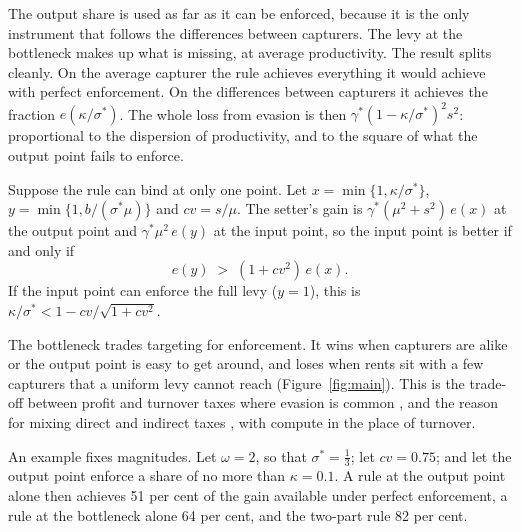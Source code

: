 The output share is used as far as it can be enforced, because it is the only instrument
that follows the differences between capturers. The levy at the bottleneck makes up what
is missing, at average productivity. The result splits cleanly. On the average capturer
the rule achieves everything it would achieve with perfect enforcement. On the
differences between capturers it achieves the fraction $e(\kappa/\sigma^*)$. The whole
loss from evasion is then $\gamma^*(1-\kappa/\sigma^*)^2s^2$: proportional to the
dispersion of productivity, and to the square of what the output point fails to enforce.

\begin{corollary}\label{cor:one}
Suppose the rule can bind at only one point. Let $x=\min\{1,\kappa/\sigma^*\}$,
$y=\min\{1,b/(\sigma^*\mu)\}$ and $cv=s/\mu$. The setter's gain is
$\gamma^*(\mu^2+s^2)\,e(x)$ at the output point and $\gamma^*\mu^2\,e(y)$ at the input
point, so the input point is better if and only if
\begin{equation}
  e(y)\;>\;(1+cv^2)\,e(x).
\end{equation}
If the input point can enforce the full levy ($y=1$), this is
$\kappa/\sigma^*<1-cv/\sqrt{1+cv^2}$.
\end{corollary}

The bottleneck trades targeting for enforcement. It wins when capturers are alike or the
output point is easy to get around, and loses when rents sit with a few capturers that a
uniform levy cannot reach (Figure~\ref{fig:main}). This is the trade-off between profit
and turnover taxes where evasion is common \citep{BestEtAl2015}, and the reason for
mixing direct and indirect taxes \citep{BoadwayMarchandPestieau1994}, with compute in the
place of turnover.

An example fixes magnitudes. Let $\omega=2$, so that $\sigma^*=\frac13$; let $cv=0.75$;
and let the output point enforce a share of no more than $\kappa=0.1$. A rule at the
output point alone then achieves 51 per cent of the gain available under perfect
enforcement, a rule at the bottleneck alone 64 per cent, and the two-part rule 82 per
cent.

